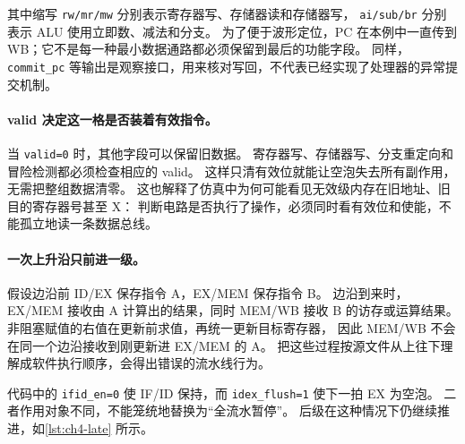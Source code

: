 其中缩写 \texttt{rw/mr/mw} 分别表示寄存器写、存储器读和存储器写，
\texttt{ai/sub/br} 分别表示 ALU 使用立即数、减法和分支。
为了便于波形定位，PC 在本例中一直传到 WB；它不是每一种最小数据通路都必须保留到最后的功能字段。
同样，\texttt{commit\_pc} 等输出是观察接口，用来核对写回，不代表已经实现了处理器的异常提交机制。

\paragraph{valid 决定这一格是否装着有效指令。}
当 \texttt{valid=0} 时，其他字段可以保留旧数据。
寄存器写、存储器写、分支重定向和冒险检测都必须检查相应的 valid。
这样只清有效位就能让空泡失去所有副作用，无需把整组数据清零。
这也解释了仿真中为何可能看见无效级内存在旧地址、旧目的寄存器号甚至 X：
判断电路是否执行了操作，必须同时看有效位和使能，不能孤立地读一条数据总线。

\paragraph{一次上升沿只前进一级。}
假设边沿前 ID/EX 保存指令 A，EX/MEM 保存指令 B。
边沿到来时，EX/MEM 接收由 A 计算出的结果，同时 MEM/WB 接收 B 的访存或运算结果。
非阻塞赋值的右值在更新前求值，再统一更新目标寄存器，
因此 MEM/WB 不会在同一个边沿接收到刚更新进 EX/MEM 的 A。
把这些过程按源文件从上往下理解成软件执行顺序，会得出错误的流水线行为。

\par\noindent\begin{minipage}{\linewidth}\vspace{8pt}

\end{minipage}\par

代码中的 \texttt{ifid\_en=0} 使 IF/ID 保持，而 \texttt{idex\_flush=1} 使下一拍 EX 为空泡。
二者作用对象不同，不能笼统地替换为“全流水暂停”。
后级在这种情况下仍继续推进，如\cref{lst:ch4-late} 所示。

\par\noindent\begin{minipage}{\linewidth}\vspace{8pt}

\end{minipage}\par

